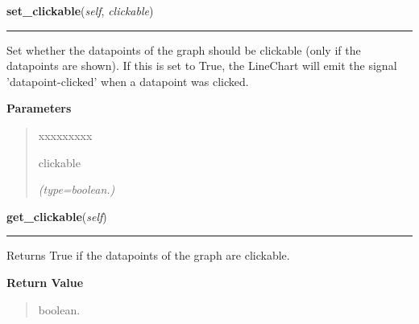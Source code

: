 \hspace{.8\funcindent}\begin{boxedminipage}{\funcwidth}

    \raggedright \textbf{set\_clickable}(\textit{self}, \textit{clickable})

    \vspace{-1.5ex}

    \rule{\textwidth}{0.5\fboxrule}
\setlength{\parskip}{2ex}
    Set whether the datapoints of the graph should be clickable (only if 
    the datapoints are shown). If this is set to True, the LineChart will 
    emit the signal 'datapoint-clicked' when a datapoint was clicked.

\setlength{\parskip}{1ex}
      \textbf{Parameters}
      \vspace{-1ex}

      \begin{quote}
        \begin{Ventry}{xxxxxxxxx}

          \item[clickable]

            {\it (type=boolean.)}

        \end{Ventry}

      \end{quote}

    \end{boxedminipage}

    \label{pygtk_chart:line_chart:Graph:get_clickable}

    \vspace{0.5ex}

\hspace{.8\funcindent}\begin{boxedminipage}{\funcwidth}

    \raggedright \textbf{get\_clickable}(\textit{self})

    \vspace{-1.5ex}

    \rule{\textwidth}{0.5\fboxrule}
\setlength{\parskip}{2ex}
    Returns True if the datapoints of the graph are clickable.

\setlength{\parskip}{1ex}
      \textbf{Return Value}
    \vspace{-1ex}

      \begin{quote}
      boolean.

      \end{quote}

    \end{boxedminipage}


